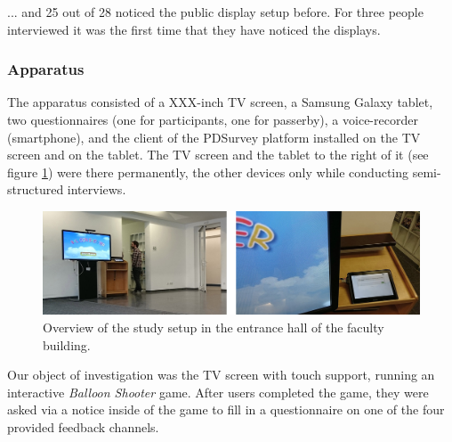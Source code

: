 		... and 25 out of 28 noticed the public display setup before. For three people interviewed it was the first time that they have noticed the displays.




	\subsubsection{Apparatus}
	\label{sec:field-study:apparatus}

		The apparatus consisted of a XXX-inch TV screen, a Samsung Galaxy tablet, two questionnaires (one for participants, one for passerby), a voice-recorder (smartphone), and the client of the PDSurvey platform installed on the TV screen and on the tablet. The TV screen and the tablet to the right of it (see figure \ref{fig:5-study-setup}) were there permanently, the other devices only while conducting semi-structured interviews.

		\begin{figure}
		    \begin{center}
   \includegraphics[width=\columnwidth]{img/5_field-study/study-setup.jpg}
		    \end{center}
		 \caption{Overview of the study setup in the entrance hall of the faculty building.}
		 \label{fig:5-study-setup}
		\end{figure}

		Our object of investigation was the TV screen with touch support, running an interactive \textit{Balloon Shooter} game. After users completed the game, they were asked via a notice inside of the game to fill in a questionnaire on one of the four provided feedback channels. 
		

